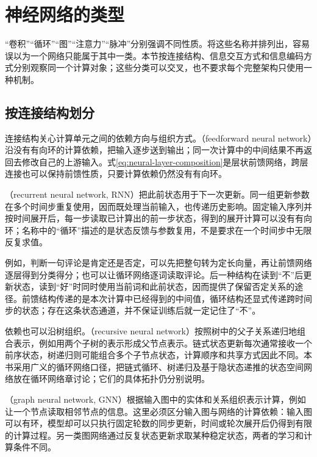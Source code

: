 \section{神经网络的类型}
\label{sec:neural-network-types}

“卷积”“循环”“图”“注意力”“脉冲”分别强调不同性质。将这些名称并排列出，容易误以为一个网络只能属于其中一类。本节按连接结构、信息交互方式和信息编码方式分别观察同一个计算对象；这些分类可以交叉，也不要求每个完整架构只使用一种机制。

\subsection{按连接结构划分}
\label{sec:neural-types-connectivity}

连接结构关心计算单元之间的依赖方向与组织方式。（feedforward neural network）沿没有有向环的计算依赖，把输入逐步送到输出；同一次计算中的中间结果不再返回去修改自己的上游输入。式\eqref{eq:neural-layer-composition}是层状前馈网络，跨层连接也可以保持前馈性质，只要计算依赖仍然没有有向环。

（recurrent neural network, RNN）把此前状态用于下一次更新。同一组更新参数在多个时间步重复使用，因而既处理当前输入，也传递历史影响。固定输入序列并按时间展开后，每一步读取已计算出的前一步状态，得到的展开计算可以没有有向环；名称中的“循环”描述的是状态反馈与参数复用，不是要求在一个时间步中无限反复求值。

例如，判断一句评论是肯定还是否定，可以先把整句转为定长向量，再让前馈网络逐层得到分类得分；也可以让循环网络逐词读取评论。后一种结构在读到“不”后更新状态，读到“好”时同时使用当前词和此前状态，因而提供了保留否定关系的途径。前馈结构传递的是本次计算中已经得到的中间值，循环结构还显式传递跨时间步的状态；存在这条状态通道，并不保证训练后就一定记住了“不”。

依赖也可以沿树组织。（recursive neural network）按照树中的父子关系递归地组合表示，例如用两个子树的表示形成父节点表示。链式状态更新每次通常接收一个前序状态，树递归则可能组合多个子节点状态，计算顺序和共享方式因此不同。本书采用广义的循环网络口径，把链式循环、树递归及基于隐状态递推的状态空间网络放在循环网络章讨论；它们的具体拓扑仍分别说明。

（graph neural network, GNN）根据输入图中的实体和关系组织表示计算，例如让一个节点读取相邻节点的信息。这里必须区分输入图与网络的计算依赖：输入图可以有环，模型却可以只执行固定轮数的同步更新，时间或轮次展开后仍得到有限的计算过程。另一类图网络通过反复状态更新求取某种稳定状态，两者的学习和计算条件不同。

